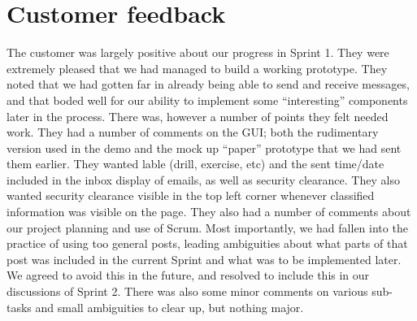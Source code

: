 \section{Customer feedback}

The customer was largely positive about our progress in Sprint 1. They were extremely pleased that we had managed to build a working prototype. They noted that we had gotten far in already being able to send and receive messages, and that boded well for our ability to implement some “interesting” components later in the process.
\newline
\newline
There was, however a number of points they felt needed work. They had a number of comments on the GUI; both the rudimentary version used in the demo and the mock up “paper” prototype that we had sent them earlier. They wanted lable (drill, exercise, etc) and the sent time/date included in the inbox display of emails, as well as security clearance. They also wanted security clearance visible in the top left corner whenever classified information was visible on the page. 
\newline
\newline
They also had a number of comments about our project planning and use of Scrum. Most importantly, we had fallen into the practice of using too general posts, leading ambiguities about what parts of that post was included in the current Sprint and what was to be implemented later. We agreed to avoid this in the future, and resolved to include this in our discussions of Sprint 2. There was also some minor comments on various sub-tasks and small ambiguities to clear up, but nothing major.